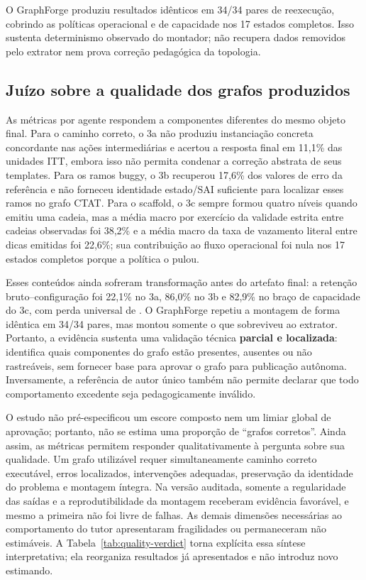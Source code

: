 \documentclass[11pt,a4paper]{article}
\newcommand{\ITT}{ITT}
\begin{document}
O GraphForge produziu resultados idênticos em 34/34 pares de reexecução, cobrindo as políticas operacional e de capacidade nos 17 estados completos. Isso sustenta determinismo observado do montador; não recupera dados removidos pelo extrator nem prova correção pedagógica da topologia.

\subsection{Juízo sobre a qualidade dos grafos produzidos}

As métricas por agente respondem a componentes diferentes do mesmo objeto final. Para o caminho correto, o 3a não produziu instanciação concreta concordante nas ações intermediárias e acertou a resposta final em 11,1\% das unidades \ITT{}, embora isso não permita condenar a correção abstrata de seus templates. Para os ramos buggy, o 3b recuperou 17,6\% dos valores de erro da referência e não forneceu identidade estado/SAI suficiente para localizar esses ramos no grafo CTAT. Para o scaffold, o 3c sempre formou quatro níveis quando emitiu uma cadeia, mas a média macro por exercício da validade estrita entre cadeias observadas foi 38,2\% e a média macro da taxa de vazamento literal entre dicas emitidas foi 22,6\%; sua contribuição ao fluxo operacional foi nula nos 17 estados completos porque a política o pulou.

Esses conteúdos ainda sofreram transformação antes do artefato final: a retenção bruto--configuração foi 22,1\% no 3a, 86,0\% no 3b e 82,9\% no braço de capacidade do 3c, com perda universal de . O GraphForge repetiu a montagem de forma idêntica em 34/34 pares, mas montou somente o que sobreviveu ao extrator. Portanto, a evidência sustenta uma validação técnica \textbf{parcial e localizada}: identifica quais componentes do grafo estão presentes, ausentes ou não rastreáveis, sem fornecer base para aprovar o grafo para publicação autônoma. Inversamente, a referência de autor único também não permite declarar que todo comportamento excedente seja pedagogicamente inválido.

O estudo não pré-especificou um escore composto nem um limiar global de aprovação; portanto, não se estima uma proporção de ``grafos corretos''. Ainda assim, as métricas permitem responder qualitativamente à pergunta sobre sua qualidade. Um grafo utilizável requer simultaneamente caminho correto executável, erros localizados, intervenções adequadas, preservação da identidade do problema e montagem íntegra. Na versão auditada, somente a regularidade das saídas e a reprodutibilidade da montagem receberam evidência favorável, e mesmo a primeira não foi livre de falhas. As demais dimensões necessárias ao comportamento do tutor apresentaram fragilidades ou permaneceram não estimáveis. A Tabela~\ref{tab:quality-verdict} torna explícita essa síntese interpretativa; ela reorganiza resultados já apresentados e não introduz novo estimando.
\end{document}
